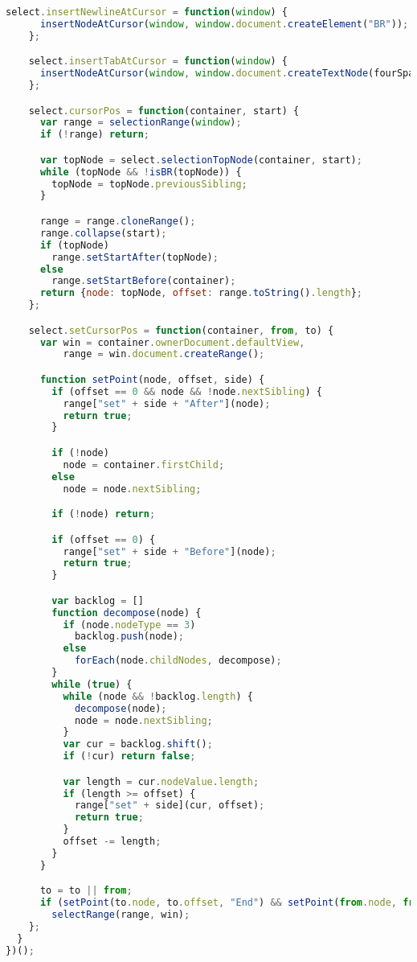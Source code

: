 \begin{lstlisting}[language=Javascript]
    select.insertNewlineAtCursor = function(window) {
      insertNodeAtCursor(window, window.document.createElement("BR"));
    };

    select.insertTabAtCursor = function(window) {
      insertNodeAtCursor(window, window.document.createTextNode(fourSpaces));
    };

    select.cursorPos = function(container, start) {
      var range = selectionRange(window);
      if (!range) return;

      var topNode = select.selectionTopNode(container, start);
      while (topNode && !isBR(topNode)) {
        topNode = topNode.previousSibling;
      }

      range = range.cloneRange();
      range.collapse(start);
      if (topNode)
        range.setStartAfter(topNode);
      else
        range.setStartBefore(container);
      return {node: topNode, offset: range.toString().length};
    };

    select.setCursorPos = function(container, from, to) {
      var win = container.ownerDocument.defaultView,
          range = win.document.createRange();

      function setPoint(node, offset, side) {
        if (offset == 0 && node && !node.nextSibling) {
          range["set" + side + "After"](node);
          return true;
        }

        if (!node)
          node = container.firstChild;
        else
          node = node.nextSibling;

        if (!node) return;

        if (offset == 0) {
          range["set" + side + "Before"](node);
          return true;
        }

        var backlog = []
        function decompose(node) {
          if (node.nodeType == 3)
            backlog.push(node);
          else
            forEach(node.childNodes, decompose);
        }
        while (true) {
          while (node && !backlog.length) {
            decompose(node);
            node = node.nextSibling;
          }
          var cur = backlog.shift();
          if (!cur) return false;

          var length = cur.nodeValue.length;
          if (length >= offset) {
            range["set" + side](cur, offset);
            return true;
          }
          offset -= length;
        }
      }

      to = to || from;
      if (setPoint(to.node, to.offset, "End") && setPoint(from.node, from.offset, "Start"))
        selectRange(range, win);
    };
  }
})();
\end{lstlisting}

